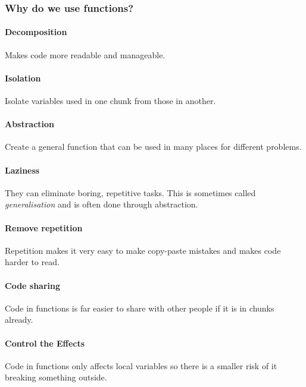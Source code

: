 \subsubsection{Why do we use functions?}\label{ssub:why_do_we_use_functions_}

\paragraph{Decomposition}\label{par:decomposition}

Makes code more readable and manageable.

\paragraph{Isolation}\label{par:isolation}

Isolate variables used in one chunk from those in another.

\paragraph{Abstraction}\label{par:abstraction}

Create a general function that can be used in many places for different problems.

\paragraph{Laziness}\label{par:laziness}

They can eliminate boring, repetitive tasks.
This is sometimes called \emph{generalisation} and is often done through abstraction. %

\paragraph{Remove repetition}\label{par:remove_repetition}

Repetition makes it very easy to make copy-paste mistakes and makes code harder to read.

\paragraph{Code sharing}\label{par:code_sharing}

Code in functions is far easier to share with other people if it is in chunks already.

\paragraph{Control the Effects}\label{par:control_the_effects}

Code in functions only affects local variables so there is a smaller risk of it breaking something outside.
